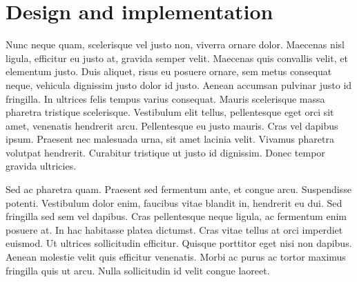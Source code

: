 \section{Design and implementation}

Nunc neque quam, scelerisque vel justo non, viverra ornare dolor. Maecenas nisl ligula, efficitur eu justo at, gravida semper velit. Maecenas quis convallis velit, et elementum justo. Duis aliquet, risus eu posuere ornare, sem metus consequat neque, vehicula dignissim justo dolor id justo. Aenean accumsan pulvinar justo id fringilla. In ultrices felis tempus varius consequat. Mauris scelerisque massa pharetra tristique scelerisque. Vestibulum elit tellus, pellentesque eget orci sit amet, venenatis hendrerit arcu. Pellentesque eu justo mauris. Cras vel dapibus ipsum. Praesent nec malesuada urna, sit amet lacinia velit. Vivamus pharetra volutpat hendrerit. Curabitur tristique ut justo id dignissim. Donec tempor gravida ultricies.

Sed ac pharetra quam. Praesent sed fermentum ante, et congue arcu. Suspendisse potenti. Vestibulum dolor enim, faucibus vitae blandit in, hendrerit eu dui. Sed fringilla sed sem vel dapibus. Cras pellentesque neque ligula, ac fermentum enim posuere at. In hac habitasse platea dictumst. Cras vitae tellus at orci imperdiet euismod. Ut ultrices sollicitudin efficitur. Quisque porttitor eget nisi non dapibus. Aenean molestie velit quis efficitur venenatis. Morbi ac purus ac tortor maximus fringilla quis ut arcu. Nulla sollicitudin id velit congue laoreet.
